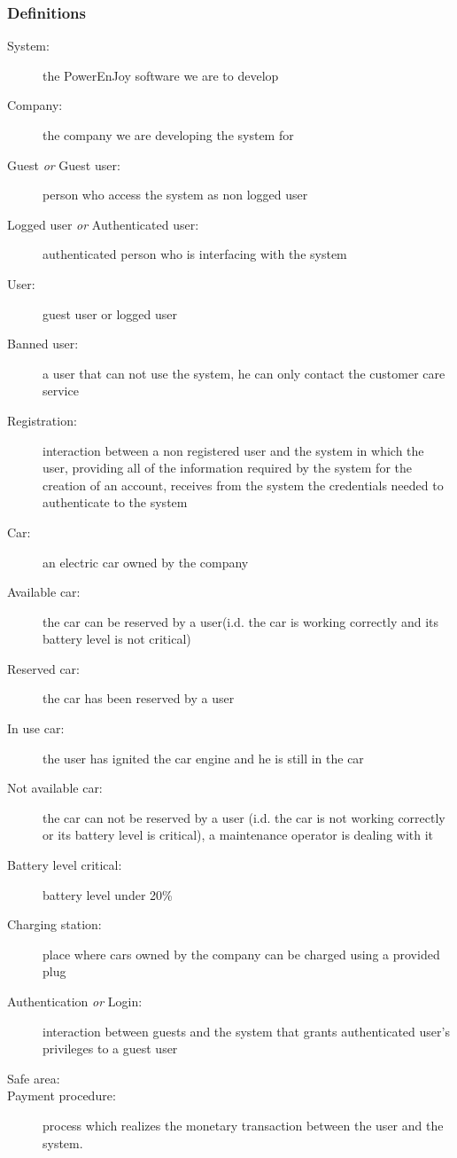 	\subsubsection{Definitions}
	\begin{description}
		\item[System:]the PowerEnJoy software we are to develop
		\item[Company:] the company we are developing the system for
		\item[Guest \emph{or} Guest user:] person who access the system as non logged user
		\item[Logged user \emph{or} Authenticated user:] authenticated person who is interfacing with the system
		\item[User:]  guest user or logged user
		\item[Banned user:] a user that can not use the system, he can only contact the customer care service
		\item[Registration:]  interaction between a non registered user and the system in which the user, providing all of the information required by the system for the creation of an account, receives from the system the credentials needed to authenticate to the system
		\item[Car:] an electric car owned by the company
		\item[Available car:] the car can be reserved by a user(i.d. the car is working correctly and its battery level is not critical)
		\item[Reserved car:] the car has been reserved by a user
		\item[In use car:] the user has ignited the car engine and he is still in the car
		\item[Not available car:] the car can not be reserved by a user (i.d. the car is not working correctly or its battery level is critical), a maintenance operator is dealing with it
		\item[Battery level critical:] battery level under 20\%
		\item[Charging station:] place where cars owned by the company can be charged using a provided plug
		\item[Authentication \emph{or} Login:] interaction between guests and the system that grants authenticated user's privileges to a guest user
		\item[Safe area:]
		\item[Payment procedure:] process which realizes the monetary transaction between the user and the system.
	\end{description}
